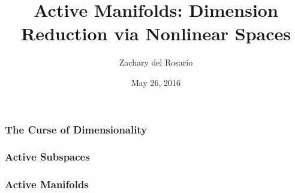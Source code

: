 \documentclass{beamer}
\title[Active Manifolds]{Active Manifolds: Dimension Reduction via Nonlinear Spaces} %
\author{Zachary del Rosario} %
\date{May 26, 2016} %
\begin{document}
\begin{frame}
\titlepage %
\end{frame}


\begin{frame}
\frametitle{The Curse of Dimensionality}
\end{frame}


\begin{frame}
\frametitle{Active Subspaces}

\end{frame}


\begin{frame}
\frametitle{Active Manifolds}

\end{frame}

\end{document}
